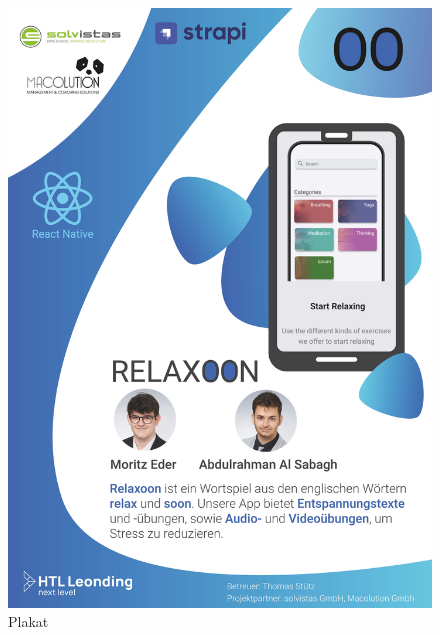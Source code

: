 \begin{spacing}{1}
    \begin{figure}[H]
        \centering
        \includegraphics[height=1.4\textwidth]{./pics/Relaxoon-Plakat.jpg}
        \caption{Plakat}
    \end{figure}


\end{spacing}


